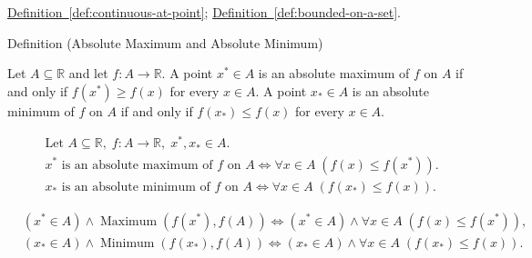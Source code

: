 \begin{remark*}[Dependencies]
\hyperref[def:continuous-at-point]{Definition~\ref*{def:continuous-at-point}}; \hyperref[def:bounded-on-a-set]{Definition~\ref*{def:bounded-on-a-set}}.
\end{remark*}


\begin{definitionbox}{Definition (Absolute Maximum and Absolute Minimum)}
\begin{definition}
\label{def:absolute-extrema}
Let $A \subseteq \mathbb{R}$ and let $f \colon A \to \mathbb{R}$. A point $x^{*} \in A$ is an absolute maximum of $f$ on $A$ if and only if $f(x^{*}) \ge f(x)$ for every $x \in A$. A point $x_{*} \in A$ is an absolute minimum of $f$ on $A$ if and only if $f(x_{*}) \le f(x)$ for every $x \in A$.
\end{definition}
\end{definitionbox}

\begin{remark*}
\[
\begin{aligned}
&\text{Let } A \subseteq \mathbb{R},\; f \colon A \to \mathbb{R},\; x^{*}, x_{*} \in A.\\
&x^{*} \text{ is an absolute maximum of } f \text{ on } A
\Longleftrightarrow \forall x \in A\; (f(x) \le f(x^{*})).\\
&x_{*} \text{ is an absolute minimum of } f \text{ on } A
\Longleftrightarrow \forall x \in A\; (f(x_{*}) \le f(x)).
\end{aligned}
\]
\end{remark*}

\begin{remark*}
\[
\begin{aligned}
&(x^{*} \in A) \land \operatorname{Maximum}(f(x^{*}), f(A))
\Longleftrightarrow (x^{*} \in A) \land \forall x \in A\; (f(x) \le f(x^{*})),\\
&(x_{*} \in A) \land \operatorname{Minimum}(f(x_{*}), f(A))
\Longleftrightarrow (x_{*} \in A) \land \forall x \in A\; (f(x_{*}) \le f(x)).
\end{aligned}
\]
\end{remark*}

